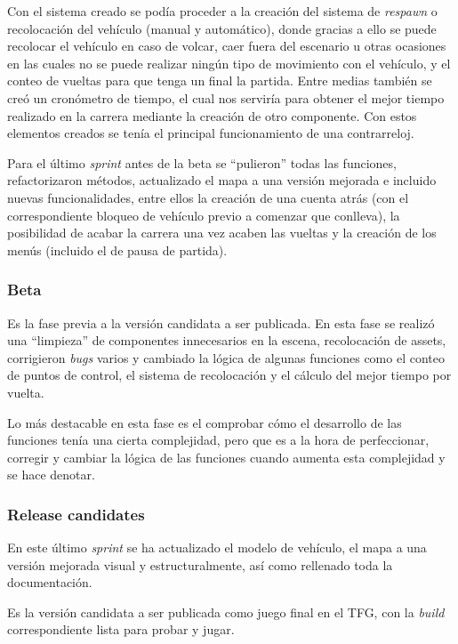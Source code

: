 Con el sistema creado se podía proceder a la creación del sistema de \textit{respawn} o recolocación del vehículo (manual y automático), donde gracias a ello se puede recolocar el vehículo en caso de volcar, caer fuera del escenario u otras ocasiones en las cuales no se puede realizar ningún tipo de movimiento con el vehículo, y el conteo de vueltas para que tenga un final la partida. Entre medias también se creó un cronómetro de tiempo, el cual nos serviría para obtener el mejor tiempo realizado en la carrera mediante la creación de otro componente. Con estos elementos creados se tenía el principal funcionamiento de una contrarreloj.

Para el último \textit{sprint} antes de la beta se ``pulieron'' todas las funciones, refactorizaron métodos, actualizado el mapa a una versión mejorada e incluido nuevas funcionalidades, entre ellos la creación de una cuenta atrás (con el correspondiente bloqueo de vehículo previo a comenzar que conlleva), la posibilidad de acabar la carrera una vez acaben las vueltas y la creación de los menús (incluido el de pausa de partida).

\subsubsection{Beta}

Es la fase previa a la versión candidata a ser publicada. En esta fase se realizó una ``limpieza'' de componentes innecesarios en la escena, recolocación de assets, corrigieron \textit{bugs} varios y cambiado la lógica de algunas funciones como el conteo de puntos de control, el sistema de recolocación y el cálculo del mejor tiempo por vuelta.

Lo más destacable en esta fase es el comprobar cómo el desarrollo de las funciones tenía una cierta complejidad, pero que es a la hora de perfeccionar, corregir y cambiar la lógica de las funciones cuando aumenta esta complejidad y se hace denotar.

\subsubsection{Release candidates}

En este último \textit{sprint} se ha actualizado el modelo de vehículo, el mapa a una versión mejorada visual y estructuralmente, así como rellenado toda la documentación.

Es la versión candidata a ser publicada como juego final en el TFG, con la \textit{build} correspondiente lista para probar y jugar.

